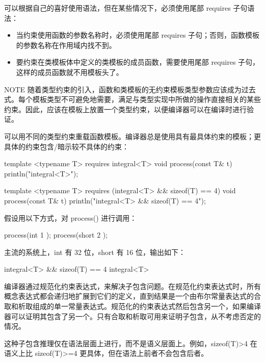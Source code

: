 可以根据自己的喜好使用语法，但在某些情况下，必须使用尾部 requires 子句语法：

\begin{itemize}
\item
当约束使用函数的参数名称时，必须使用尾部 requires 子句；否则，函数模板的参数名称在作用域内找不到。

\item
要约束在类模板体中定义的类模板的成员函数，需要使用尾部 requires 子句，这样的成员函数就不用模板头了。
\end{itemize}

\begin{myNotic}{NOTE}
随着类型约束的引入，函数和类模板的无约束模板类型参数应该成为过去式。每个模板类型不可避免地需要，满足与类型实现中所做的操作直接相关的某些约束。因此，应该在模板上放置一个类型约束，以便编译器可以在编译时进行验证。
\end{myNotic}


可以用不同的类型约束重载函数模板。编译器总是使用具有最具体约束的模板；更具体的约束包含/暗示较不具体的约束：

\begin{cpp}
template <typename T> requires integral<T>
void process(const T& t) { println("integral<T>"); }

template <typename T> requires (integral<T> && sizeof(T) == 4)
void process(const T& t) { println("integral<T> && sizeof(T) == 4"); }
\end{cpp}

假设用以下方式，对 process() 进行调用：

\begin{cpp}
process(int { 1 });
process(short { 2 });
\end{cpp}

主流的系统上，int 有 32 位，short 有 16 位，输出如下：

\begin{shell}
integral<T> && sizeof(T) == 4
integral<T>
\end{shell}

编译器通过规范化约束表达式，来解决子包含问题。在规范化约束表达式时，所有概念表达式都会递归地扩展到它们的定义，直到结果是一个由布尔常量表达式的合取和析取组成的单一常量表达式。规范化的约束表达式然后包含另一个，如果编译器可以证明其包含了另一个。只有合取和析取可用来证明子包含，从不考虑否定的情况。

这种子包含推理仅在语法层面上进行，而不是语义层面上。例如，sizeof(T)>4 在语义上比 sizeof(T)>=4 更具体，但在语法上前者不会包含后者。

